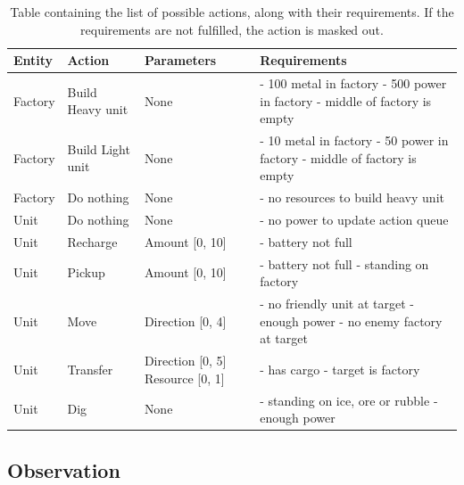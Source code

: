 \begin{table}[htbp]
    \centering
    \begin{tabular}{p{1.5cm}|p{3cm}|p{3cm}|p{6cm}}
        \hline
        Entity & Action & Parameters & Requirements \\
        \hline
        Factory & Build Heavy unit & None & - 100 metal in factory \newline - 500 power in factory \newline - middle of factory is empty \\
        \hline
        Factory & Build Light unit & None & - 10 metal in factory \newline - 50 power in factory \newline - middle of factory is empty \\
        \hline
        Factory & Do nothing & None & - no resources to build heavy unit \\
        \hline
        Unit & Do nothing & None & - no power to update action queue \\
        \hline
        Unit & Recharge & Amount [0, 10] & - battery not full \\
        \hline
        Unit & Pickup & Amount [0, 10] & - battery not full \newline - standing on factory \\
        \hline
        Unit & Move & Direction [0, 4] & - no friendly unit at target \newline - enough power \newline - no enemy factory at target \\
        \hline
        Unit & Transfer & Direction [0, 5] \newline Resource [0, 1] & - has cargo \newline - target is factory \\
        \hline
        Unit & Dig & None & - standing on ice, ore or rubble \newline - enough power \\
        \hline
    \end{tabular}
    \caption{Table containing the list of possible actions, along with their requirements. If the requirements are not fulfilled, the action is masked out.}
    \label{tab:actions}
\end{table}


\subsection{Observation}

